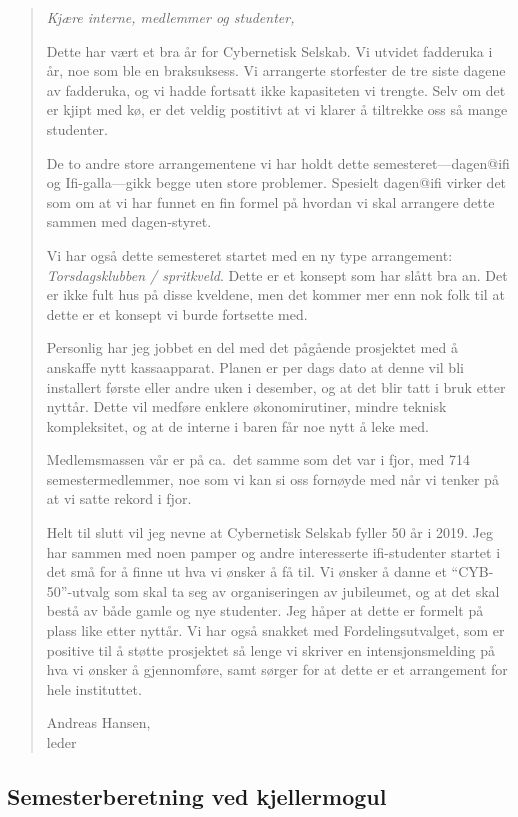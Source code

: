 \documentclass[10pt,norsk,a4paper]{article}
\begin{document}
\begin{quote}
	\textit{Kjære interne, medlemmer og studenter,}

	Dette har vært et bra år for Cybernetisk Selskab. Vi utvidet fadderuka i år, noe som ble en braksuksess. Vi arrangerte storfester de tre siste dagene av fadderuka, og vi hadde fortsatt ikke kapasiteten vi trengte. Selv om det er kjipt med kø, er det veldig postitivt at vi klarer å tiltrekke oss så mange studenter.

	De to andre store arrangementene vi har holdt dette semesteret---dagen@ifi og Ifi-galla---gikk begge uten store problemer. Spesielt dagen@ifi virker det som om at vi har funnet en fin formel på hvordan vi skal arrangere dette sammen med dagen-styret.

	Vi har også dette semesteret startet med en ny type arrangement: \textit{Torsdagsklubben / spritkveld}. Dette er et konsept som har slått bra an. Det er ikke fult hus på disse kveldene, men det kommer mer enn nok folk til at dette er et konsept vi burde fortsette med.

	Personlig har jeg jobbet en del med det pågående prosjektet med å anskaffe nytt kassaapparat. Planen er per dags dato at denne vil bli installert første eller andre uken i desember, og at det blir tatt i bruk etter nyttår. Dette vil medføre enklere økonomirutiner, mindre teknisk kompleksitet, og at de interne i baren får noe nytt å leke med.

	Medlemsmassen vår er på ca.\ det samme som det var i fjor, med 714 semestermedlemmer, noe som vi kan si oss fornøyde med når vi tenker på at vi satte rekord i fjor.

	Helt til slutt vil jeg nevne at Cybernetisk Selskab fyller 50 år i 2019. Jeg har sammen med noen pamper og andre interesserte ifi-studenter startet i det små for å finne ut hva vi ønsker å få til. Vi ønsker å danne et ``CYB-50''-utvalg som skal ta seg av organiseringen av jubileumet, og at det skal bestå av både gamle og nye studenter. Jeg håper at dette er formelt på plass like etter nyttår. Vi har også snakket med Fordelingsutvalget, som er positive til å støtte prosjektet så lenge vi skriver en intensjonsmelding på hva vi ønsker å gjennomføre, samt sørger for at dette er et arrangement for hele instituttet.

	Andreas Hansen,\\
	leder
\end{quote}



\subsection{Semesterberetning ved kjellermogul}
\end{document}
